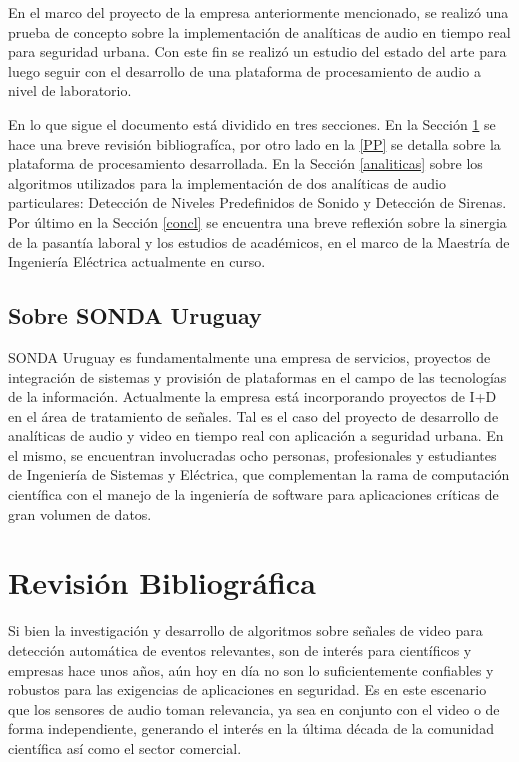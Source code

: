 \documentclass{article}
\begin{document}
\bigskip
En el marco del proyecto de la empresa anteriormente mencionado, se realizó una prueba de concepto sobre la implementación de analíticas de audio en tiempo real para seguridad urbana. Con este fin se realizó un estudio del estado del arte para luego seguir con el desarrollo de una plataforma de procesamiento de audio a nivel de laboratorio. 

\bigskip
En lo que sigue el documento está dividido en tres secciones. En la Sección \ref{literatura} se hace una breve revisión bibliografíca, por otro lado en la \ref{PP} se detalla sobre la plataforma de procesamiento desarrollada. En la Sección \ref{analiticas} sobre los algoritmos utilizados para la implementación de dos analíticas de audio particulares: Detección de Niveles Predefinidos de Sonido y Detección de Sirenas. Por último en la Sección \ref{concl} se encuentra una breve reflexión sobre la sinergia de la pasantía laboral y los estudios de académicos, en el marco de la Maestría de Ingeniería Eléctrica actualmente en curso.  

\subsection{Sobre SONDA Uruguay}
SONDA Uruguay es fundamentalmente una empresa de servicios, proyectos de integración de sistemas y provisión de plataformas en el campo de las tecnologías de la información. Actualmente la empresa está incorporando proyectos de I+D en el área de tratamiento de señales. Tal es el caso del proyecto de desarrollo de analíticas de audio y video en tiempo real con aplicación a seguridad urbana. En el mismo, se encuentran involucradas ocho personas, profesionales y estudiantes de Ingeniería de Sistemas y Eléctrica, que complementan la rama de computación científica con el manejo de la ingeniería de software para aplicaciones críticas de gran volumen de datos.  


\section{Revisión Bibliográfica}
\label{literatura}
Si bien la investigación y desarrollo de algoritmos sobre señales de video para detección automática de eventos relevantes, son de interés para científicos y empresas hace unos años, aún hoy en día no son lo suficientemente confiables y robustos para las exigencias de aplicaciones en seguridad. Es en este escenario que los sensores de audio toman relevancia, ya sea en conjunto con el video o de forma independiente, generando el interés en la última década de la comunidad científica así como el sector comercial. 
\end{document}
